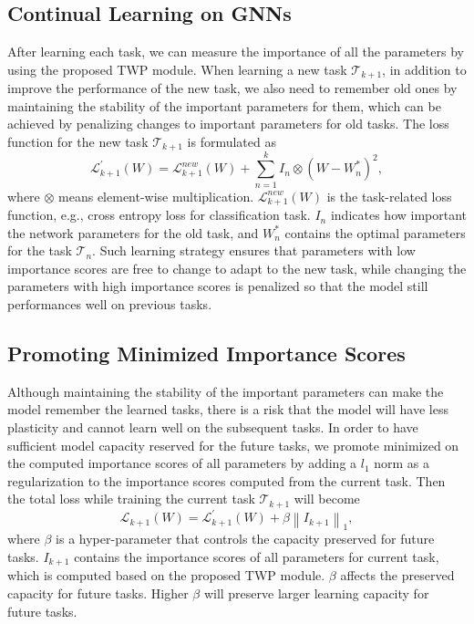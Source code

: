 \documentclass[letterpaper]{article} %
\begin{document}
\subsection{Continual Learning on GNNs}
After learning each task, we can measure the
importance of all the parameters
by using the proposed TWP module.
When learning a new task $\mathcal{T}_{k+1}$,
in addition to improve the performance of
the new task,
we also need to remember old ones
by maintaining the stability of
the important parameters for them, which can be achieved
by penalizing changes to important parameters for old tasks.
The loss function for the new task $\mathcal{T}_{k+1}$ is
formulated as
\begin{equation}
\label{loss2}
  \mathcal{L}^{'}_{k+1}(W) = \mathcal{L}_{k+1}^{new}(W) +  \sum_{n=1}^{k} I_n \otimes (W - W^*_{n})^{2},
\end{equation}
\noindent where $\otimes$ means element-wise multiplication.
$\mathcal{L}_{k+1}^{new}(W)$ is the
task-related loss function,
e.g., cross entropy
loss for classification task.
$I_n$ indicates how important the network parameters
for the old task,
and $W_n^*$ contains the optimal parameters for
the task $\mathcal{T}_n$.
Such learning strategy ensures that parameters with low importance scores
are free to change to adapt to the new task,
while changing the parameters with high importance scores is penalized
so that the model still performances well on  previous tasks.



\subsection{Promoting Minimized Importance Scores}
Although maintaining the stability of the important parameters can make the model
remember the learned tasks, there is a risk that the model
will have less plasticity and cannot learn well on the subsequent tasks.
In order to have sufficient model capacity reserved for the future tasks,
we promote minimized on the computed importance scores
of all parameters by adding
a $l_1$ norm as a regularization to the importance scores
computed from the current task.
Then the total loss while training the current task
$\mathcal{T}_{k+1}$ will become
\begin{equation}
\label{totalloss}
  \mathcal{L}_{k+1}(W) = \mathcal{L}^{'}_{k+1}(W) + \beta  \left\| I_{k+1}  \right\|_1,
\end{equation}
\noindent where $\beta$ is a hyper-parameter that
controls the capacity preserved for future tasks.
$I_{k+1}$ contains the importance scores of all parameters
for current task, which is
computed based on the proposed TWP module.
$\beta$ affects the preserved capacity for future tasks.
Higher $\beta$ will preserve larger learning capacity for
future tasks.
\end{document}

